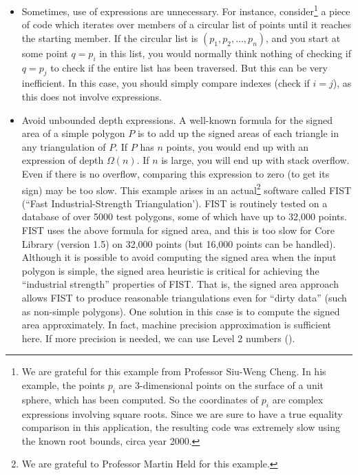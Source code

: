 \documentclass[12pt]{article}
\begin{document}
\begin{itemize}
\item
Sometimes, use of expressions are unnecessary.
For instance, consider\footnote{
We are grateful for this example from Professor Siu-Weng Cheng.  
In his example,
the points $p_i$ are 3-dimensional points on the surface
of a unit sphere, which has been computed.  So the coordinates
of $p_i$ are complex expressions involving square roots.
Since we are sure to have a true equality comparison in this
application, the resulting code was
extremely slow using the known root bounds, circa year 2000.
} a piece of code
which iterates over members of a circular list of points until
it reaches the starting member.
If the circular list is $(p_1, p_2,\ldots, p_n)$, and you start
at some point $q=p_i$ in this list, you would normally
think nothing of checking if $q = p_j$ to check if the
entire list has been traversed.  But this can be very 
inefficient.  In this case, you should simply compare
indexes (check if $i=j$), as this does not involve expressions.
\item
Avoid unbounded depth expressions.
A well-known formula \cite{orourke:bk}
for the signed area of a simple polygon $P$ is to add up the signed areas
of each triangle in any triangulation of $P$.  If $P$ has $n$ points,
you would end up with an expression of depth $\Omega(n)$.
If $n$ is large, you will end up with stack overflow.  Even if
there is no overflow, comparing 
this expression to zero (to get its sign) may be too slow.
This example arises in an actual\footnote{
We are grateful to Professor Martin Held for this example.
} software called FIST (``Fast Industrial-Strength Triangulation').
FIST is routinely tested on a database of over 5000 test polygons,
some of which have up to 32,000 points.  FIST uses the above formula
for signed area, and this is too slow
for Core Library (version 1.5) on 32,000 points (but
16,000 points can be handled).
Although it is possible to avoid computing the signed area
when the input polygon is simple, the signed area heuristic is critical
for achieving the ``industrial strength'' properties of FIST.
That is, the signed area approach allows
FIST to produce reasonable triangulations even for ``dirty data''
(such as non-simple polygons).   One solution in this case is to
compute the signed area approximately.
In fact, machine precision approximation is sufficient here.
If more precision is needed, we can use Level 2 numbers (\BF).


\end{itemize}
\end{document}

